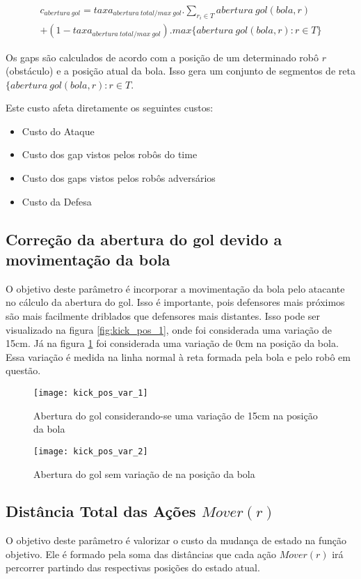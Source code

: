 \begin{multline} 
 c_{abertura{\ }gol} = taxa_{abertura{\ }total/max{\ }gol} .
   \sum_{r_i \in T} abertura{\ }gol(bola, r)\\
   + (1 - taxa_{abertura{\ }total/max{\ }gol}) .
   max \lbrace abertura{\ }gol(bola, r): r \in T \rbrace 
\end{multline}

Os gaps são calculados de acordo com a posição de um determinado robô $r$ (obstáculo)
e a posição atual da bola. Isso gera um conjunto de segmentos de reta
$\lbrace abertura{\ }gol(bola, r): r \in T $.

Este custo afeta diretamente os seguintes custos:
\begin{itemize}
  \item Custo do Ataque
  \item Custo dos gap vistos pelos robôs do time
  \item Custo dos gaps vistos pelos robôs adversários
  \item Custo da Defesa
\end{itemize}

\subsection{Correção da abertura do gol devido a movimentação da bola} 
O objetivo deste parâmetro é incorporar a movimentação
da bola pelo atacante no cálculo da abertura do gol. Isso é importante,
pois defensores mais
próximos são mais facilmente driblados que defensores mais distantes. Isso
pode ser visualizado na figura \ref{fig:kick_pos_1}, onde foi considerada
uma variação de 15cm. Já na figura \ref{fig:kick_pos_2} foi considerada uma
variação de 0cm na posição da bola. Essa variação é medida na linha normal
à reta formada pela bola e pelo robô em questão.


\begin{figure}[h]
  \centering
  \texttt{[image: kick\_pos\_var\_1]}
  \caption{Abertura do gol considerando-se uma variação de 15cm na 
           posição da bola}\label{fig:kick_pos_1}
  \texttt{[image: kick\_pos\_var\_2]}
  \caption{Abertura do gol sem variação de na posição da
           bola}\label{fig:kick_pos_2}
\end{figure}


\subsection{Distância Total das Ações $Mover(r)$} 
O objetivo deste parâmetro é valorizar o custo da
mudança de estado na função objetivo. Ele é formado pela soma das
distâncias que cada ação $Mover(r)$ irá percorrer partindo das
respectivas posições do estado atual.

